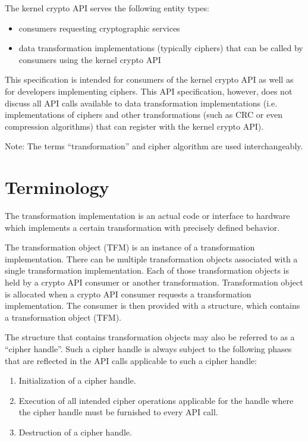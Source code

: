 \documentclass[a4paper,8pt,english]{sphinxmanual}
\begin{document}
The kernel crypto API serves the following entity types:
\begin{itemize}
\item {} 
consumers requesting cryptographic services

\item {} 
data transformation implementations (typically ciphers) that can be
called by consumers using the kernel crypto API

\end{itemize}

This specification is intended for consumers of the kernel crypto API as
well as for developers implementing ciphers. This API specification,
however, does not discuss all API calls available to data transformation
implementations (i.e. implementations of ciphers and other
transformations (such as CRC or even compression algorithms) that can
register with the kernel crypto API).

Note: The terms ``transformation'' and cipher algorithm are used
interchangeably.


\section{Terminology}
\label{crypto/intro:terminology}
The transformation implementation is an actual code or interface to
hardware which implements a certain transformation with precisely
defined behavior.

The transformation object (TFM) is an instance of a transformation
implementation. There can be multiple transformation objects associated
with a single transformation implementation. Each of those
transformation objects is held by a crypto API consumer or another
transformation. Transformation object is allocated when a crypto API
consumer requests a transformation implementation. The consumer is then
provided with a structure, which contains a transformation object (TFM).

The structure that contains transformation objects may also be referred
to as a ``cipher handle''. Such a cipher handle is always subject to the
following phases that are reflected in the API calls applicable to such
a cipher handle:
\begin{enumerate}
\item {} 
Initialization of a cipher handle.

\item {} 
Execution of all intended cipher operations applicable for the handle
where the cipher handle must be furnished to every API call.

\item {} 
Destruction of a cipher handle.

\end{enumerate}
\end{document}
